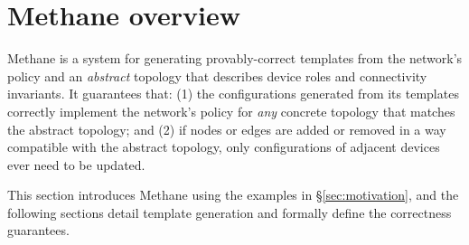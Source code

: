 \documentclass[numbers, 10pt, preprint]{sigplanconf}
\newcommand{\sysname}{{\small \sf Methane}\xspace}
\newcommand{\sysnamesec}{{\sf Methane}\xspace}
\begin{document}
%

%
%
%
%

\section{Methane overview}
\label{sec:overview}

\sysname is a system for generating provably-correct templates from the network's policy and an {\em abstract} topology that describes device roles and connectivity invariants.
It guarantees that:
(1) the configurations generated from its templates correctly implement the network's policy for {\em any} concrete topology that matches the abstract topology; and (2) if nodes or edges are added or removed in a way compatible
with the abstract topology, only configurations of adjacent devices ever need to be updated.

This section introduces \sysname using the examples in \S\ref{sec:motivation}, and the following sections detail template generation and formally define the correctness guarantees.

\end{document}
